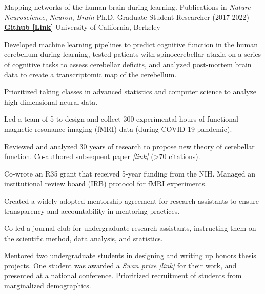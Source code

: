 

\begin{cventries}

  \cventry
  	{Mapping networks of the human brain during learning. Publications in \textit{Nature Neuroscience}, \textit{Neuron}, \textit{Brain}}
    {Ph.D. Graduate Student Researcher (2017-2022)} %
    {\href{https://github.com/maedbhk/cerebellum_learning_connect}{\textbf{Github [Link]}}}
    {University of California, Berkeley} %
    {
      \begin{cvitems} %
        \item {Developed machine learning pipelines to predict cognitive function in the human cerebellum during learning, tested patients with spinocerebellar ataxia on a series of cognitive tasks to assess cerebellar deficits, and analyzed post-mortem brain data to create a transcriptomic map of the cerebellum.}
        \item {Prioritized taking classes in advanced statistics and computer science to analyze high-dimensional neural data.} 
        \item {Led a team of 5 to design and collect 300 experimental hours of functional magnetic resonance imaging (fMRI) data (during COVID-19 pandemic).}
		\item {Reviewed and analyzed 30 years of research to propose new theory of cerebellar function. Co-authored subsequent paper \href{https://www.sciencedirect.com/science/article/pii/S0896627319303782}{\textit{[link]}} (>70 citations).}
        \item {Co-wrote an R35 grant that received 5-year funding from the NIH. Managed an institutional review board (IRB) protocol for fMRI experiments.}
        \item {Created a widely adopted mentorship agreement for research assistants to ensure transparency and accountability in mentoring practices.}
        \item {Co-led a journal club for undergraduate research assistants, instructing them on the scientific method, data analysis, and statistics.}
        \item {Mentored two undergraduate students in designing and writing up honors thesis projects. One student was awarded a \href{https://psychology.berkeley.edu/sites/default/files/undergraduate-program/swanaward_application_2019-2020.pdf}{\textit{Swan prize [link]}} for their work, and presented at a national conference. Prioritized recruitment of students from marginalized demographics.}
      \end{cvitems}
    }
    

\end{cventries}
